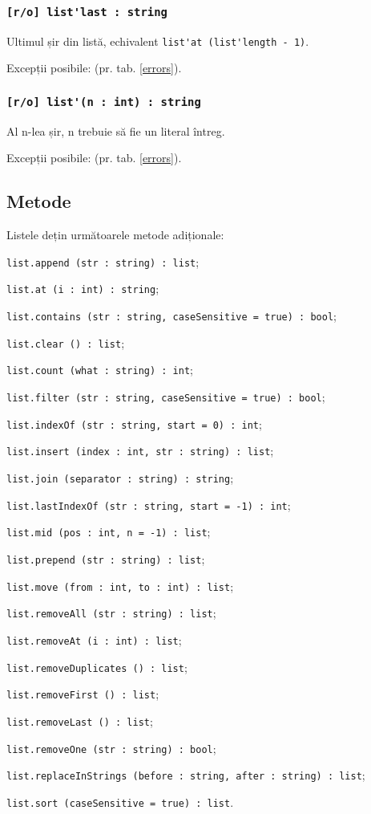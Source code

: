 \subsubsection{\lstinline|[r/o] list'last : string|}

Ultimul șir din listă, echivalent \lstinline|list'at (list'length - 1)|.

Excepții posibile:  (pr. tab. \ref{errors}).

\subsubsection{\lstinline|[r/o] list'(n : int) : string|}

Al n-lea șir, n trebuie să fie un literal întreg.

Excepții posibile:  (pr. tab. \ref{errors}).

\subsection{Metode}

Listele dețin următoarele metode adiționale:
\begin{icItems}
\item \lstinline|list.append (str : string) : list|;
\item \lstinline|list.at (i : int) : string|;
\item \lstinline|list.contains (str : string, caseSensitive = true) : bool|;
\item \lstinline|list.clear () : list|;
\item \lstinline|list.count (what : string) : int|;
\item \lstinline|list.filter (str : string, caseSensitive = true) : bool|;
\item \lstinline|list.indexOf (str : string, start = 0) : int|;
\item \lstinline|list.insert (index : int, str : string) : list|;
\item \lstinline|list.join (separator : string) : string|;
\item \lstinline|list.lastIndexOf (str : string, start = -1) : int|;
\item \lstinline|list.mid (pos : int, n = -1) : list|;
\item \lstinline|list.prepend (str : string) : list|;
\item \lstinline|list.move (from : int, to : int) : list|;
\item \lstinline|list.removeAll (str : string) : list|;
\item \lstinline|list.removeAt (i : int) : list|;
\item \lstinline|list.removeDuplicates () : list|;
\item \lstinline|list.removeFirst () : list|;
\item \lstinline|list.removeLast () : list|;
\item \lstinline|list.removeOne (str : string) : bool|;
\item \lstinline|list.replaceInStrings (before : string, after : string) : list|;
\item \lstinline|list.sort (caseSensitive = true) : list|.
\end{icItems}

